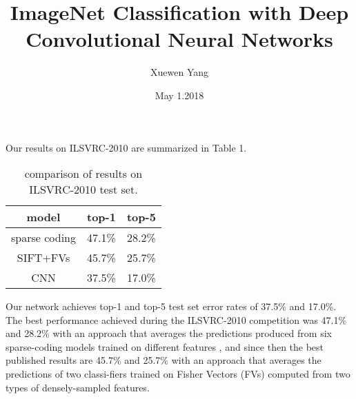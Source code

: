 \documentclass{article}
\title{ImageNet Classification with Deep Convolutional Neural Networks}
\author{Xuewen Yang}
\date{May 1.2018}
\begin{document}
\maketitle
Our results on ILSVRC-2010 are summarized in Table 1.
\begin{table}[!hbp]
\centering
\caption{comparison of results on ILSVRC-2010 test set.}
\begin{tabular}{|c|c|c|}
\hline
model&top-1&top-5\\
\hline
sparse coding&47.1\%&28.2\%\\
\hline
SIFT+FVs&45.7\%&25.7\%\\
\hline
CNN&37.5\%&17.0\%\\
\hline
\end{tabular}
\end{table}

 Our network achieves top-1 and top-5 test set error rates of 37.5\% and 17.0\%. The best performance achieved during the ILSVRC-2010 competition was 47.1\% and 28.2\% with an approach that averages the predictions produced from six sparse-coding models trained on different features , and since then the best published results are 45.7\% and 25.7\% with an approach that averages the predictions of two classi-fiers trained on Fisher Vectors (FVs) computed from two types of densely-sampled features.
\end{document}
